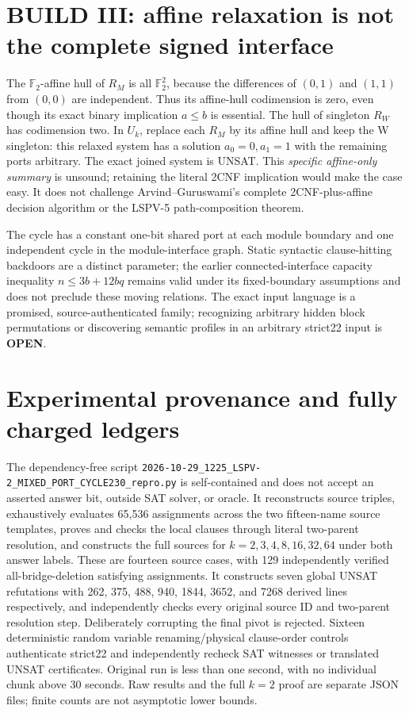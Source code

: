 \documentclass[10pt]{article}
\newcommand{\FF}{\mathbb F_2}
\begin{document}
\section{BUILD III: affine relaxation is not the complete signed interface}
The $\FF$-affine hull of $R_M$ is all $\FF^2$, because the differences of $(0,1)$ and $(1,1)$ from $(0,0)$ are independent. Thus its affine-hull codimension is zero, even though its exact binary implication $a\le b$ is essential. The hull of singleton $R_W$ has codimension two. In $U_k$, replace each $R_M$ by its affine hull and keep the W singleton: this relaxed system has a solution $a_0=0,a_1=1$ with the remaining ports arbitrary. The exact joined system is UNSAT. This \emph{specific affine-only summary} is unsound; retaining the literal 2CNF implication would make the case easy. It does not challenge Arvind--Guruswami's complete 2CNF-plus-affine decision algorithm or the LSPV-5 path-composition theorem.

The cycle has a constant one-bit shared port at each module boundary and one independent cycle in the module-interface graph. Static syntactic clause-hitting backdoors are a distinct parameter; the earlier connected-interface capacity inequality $n\le3b+12bq$ remains valid under its fixed-boundary assumptions and does not preclude these moving relations. The exact input language is a promised, source-authenticated family; recognizing arbitrary hidden block permutations or discovering semantic profiles in an arbitrary strict22 input is \textbf{OPEN}.

\section{Experimental provenance and fully charged ledgers}
The dependency-free script \texttt{2026-10-29\_1225\_LSPV-2\_MIXED\_PORT\_CYCLE230\_repro.py} is self-contained and does not accept an asserted answer bit, outside SAT solver, or oracle. It reconstructs source triples, exhaustively evaluates 65,536 assignments across the two fifteen-name source templates, proves and checks the local clauses through literal two-parent resolution, and constructs the full sources for $k=2,3,4,8,16,32,64$ under both answer labels. These are fourteen source cases, with 129 independently verified all-bridge-deletion satisfying assignments. It constructs seven global UNSAT refutations with 262, 375, 488, 940, 1844, 3652, and 7268 derived lines respectively, and independently checks every original source ID and two-parent resolution step. Deliberately corrupting the final pivot is rejected. Sixteen deterministic random variable renaming/physical clause-order controls authenticate strict22 and independently recheck SAT witnesses or translated UNSAT certificates. Original run is less than one second, with no individual chunk above 30 seconds. Raw results and the full $k=2$ proof are separate JSON files; finite counts are not asymptotic lower bounds.
\end{document}
